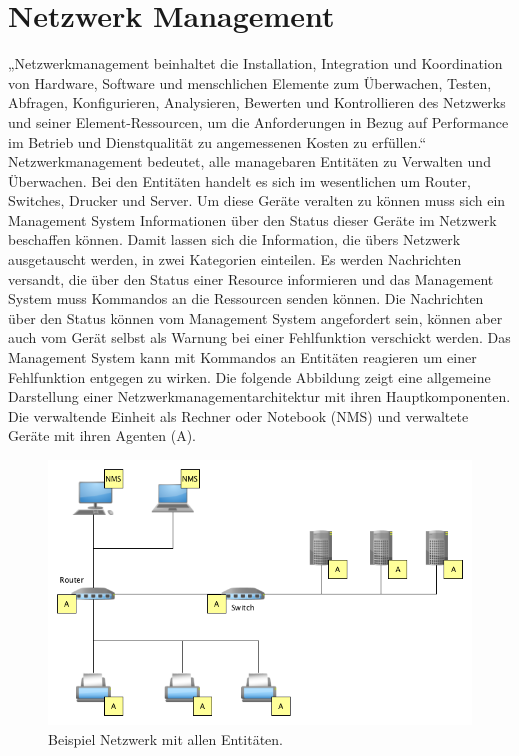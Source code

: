 \documentclass[11pt,a4paper]{article}
\begin{document}
\section{Netzwerk Management}
„Netzwerkmanagement beinhaltet die Installation, Integration und Koordination von Hardware, Software und menschlichen Elemente zum Überwachen, Testen, Abfragen, Konfigurieren, Analysieren, Bewerten und Kontrollieren des Netzwerks und seiner Element-Ressourcen, um die Anforderungen in Bezug auf Performance im Betrieb und Dienstqualität zu angemessenen Kosten zu erfüllen.“
\cite{netmanagement}
\\
Netzwerkmanagement bedeutet, alle managebaren Entitäten zu Verwalten und Überwachen. Bei den Entitäten handelt es sich im wesentlichen um Router, Switches, Drucker und Server. Um diese Geräte veralten zu können muss sich ein Management System Informationen über den Status dieser Geräte im Netzwerk beschaffen können. Damit lassen sich die Information, die übers Netzwerk ausgetauscht werden, in zwei Kategorien einteilen. Es werden Nachrichten versandt, die über den Status einer Resource informieren und das Management System muss Kommandos an die Ressourcen senden können. Die Nachrichten über den Status können vom Management System angefordert sein, können aber auch vom Gerät selbst als Warnung bei einer Fehlfunktion verschickt werden. Das Management System kann mit Kommandos an Entitäten reagieren um einer Fehlfunktion entgegen zu wirken.
Die folgende Abbildung zeigt eine allgemeine Darstellung einer Netzwerkmanagementarchitektur mit ihren Hauptkomponenten. Die verwaltende Einheit als Rechner oder Notebook (NMS) und verwaltete Geräte mit ihren Agenten (A).
\\
\begin{figure}[h]
	\centering
	\includegraphics[scale=.5]{Bilder/Netzwerk.png}
	\caption{Beispiel Netzwerk mit allen Entitäten.}
\end{figure}
\end{document}
